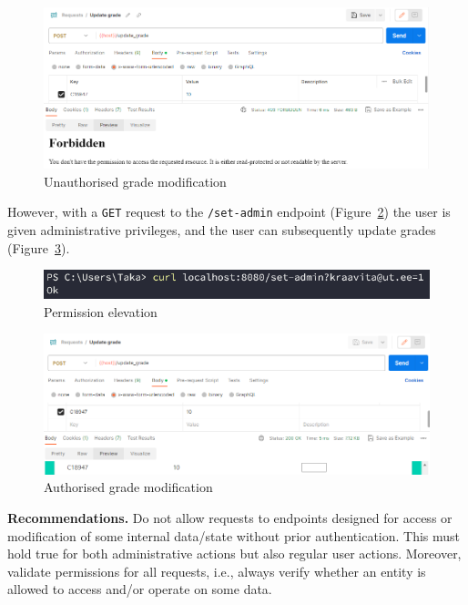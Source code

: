 \documentclass[parskip=half]{scrartcl}
\newcommand{\figref}[1]{Figure~\ref{#1}}
\begin{document}
\begin{figure}
    \centering
    \includegraphics[width=\textwidth]{forbidden_grade}
    \caption{Unauthorised grade modification}
    \label{fig:grades:failupdate}
\end{figure}

However, with a \texttt{GET} request to the \texttt{/set-admin} endpoint
(\figref{fig:setadmin}) the user is given administrative privileges, and the
user can subsequently update grades (\figref{fig:grades:update}).

\begin{figure}
    \centering
    \includegraphics[width=\textwidth]{set_admin}
    \caption{Permission elevation}
    \label{fig:setadmin}
\end{figure}

\begin{figure}
    \centering
    \includegraphics[width=\textwidth]{view_new_grade}
    \caption{Authorised grade modification}
    \label{fig:grades:update}
\end{figure}

\textbf{Recommendations.} Do not allow requests to endpoints designed for
access or modification of some internal data/state without prior
authentication. This must hold true for both administrative actions but also
regular user actions. Moreover, validate permissions for all requests, i.e.,
always verify whether an entity is allowed to access and/or operate on some
data.
\end{document}
